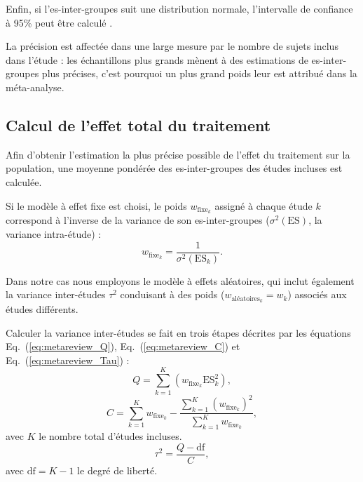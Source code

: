 Enfin, si l'\gls{es}-inter-groupes suit une distribution normale, l'intervalle de confiance à 95\% peut être calculé \citep{Borenstein2009}.

La précision est affectée dans une large mesure par le nombre de sujets inclus dans l'étude : les échantillons plus grands mènent à des
estimations de \gls{es}-inter-groupes plus précises, c'est pourquoi un plus grand poids leur est attribué dans la méta-analyse.

\subsection{Calcul de l'effet total du traitement}

Afin d'obtenir l'estimation la plus précise possible de l'effet du traitement sur la population, une moyenne pondérée des \gls{es}-inter-groupes 
des études incluses est calculée.

Si le modèle à effet fixe est choisi, le poids $w_{\text{fixe}_k}$ assigné à chaque étude $k$ correspond à l'inverse de la variance de son 
\gls{es}-inter-groupes ($\sigma^2(\text{ES})$, la variance intra-étude) \citep{Borenstein2009} :
\begin{equation}
\label{eq:metareview_weight_fixed_study}
w_{\text{fixe}_k} = \frac{1}{\sigma^2(\text{ES}_k)}.
\end{equation} 

Dans notre cas nous employons le modèle à effets aléatoires, qui inclut également la variance inter-études $\tau^2$ conduisant à des 
poids ($w_{\text{aléatoires}_k} = w_k$) associés aux études différents.

Calculer la variance inter-études se fait en trois étapes décrites par les équations Eq.~(\ref{eq:metareview_Q}), Eq.~(\ref{eq:metareview_C}) 
et Eq.~(\ref{eq:metareview_Tau}) \citep{Borenstein2009} :
\begin{equation}
\label{eq:metareview_Q}
Q = \sum_{k=1}^{K} (w_{\text{fixe}_k} \text{ES}_k^2),
\end{equation}
\begin{equation}
\label{eq:metareview_C}
C = \sum_{k=1}^{K} w_{\text{fixe}_k} - \frac{ \sum_{k=1}^{K} (w_{\text{fixe}_k})^2 } { \sum_{k=1}^{K} w_{\text{fixe}_k} },
\end{equation}
avec $K$ le nombre total d'études incluses.
\begin{equation}
\label{eq:metareview_Tau}
\tau^2 = \frac{Q - \text{df}}{C},
\end{equation}
avec $\text{df} = K - 1$ le degré de liberté.

